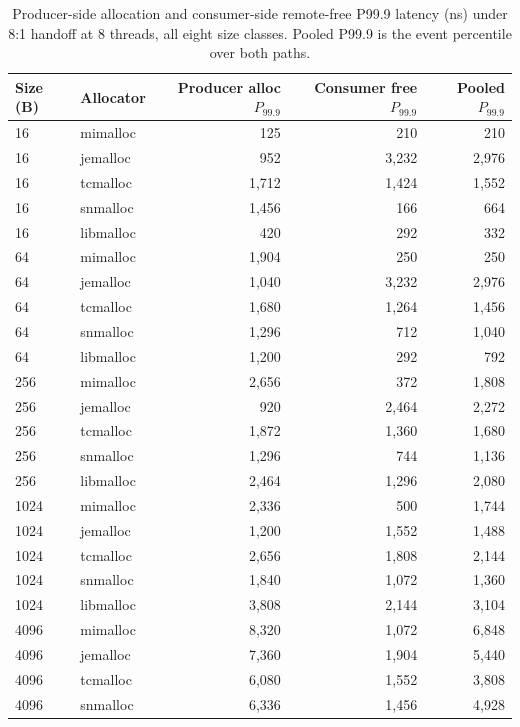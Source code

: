 \begin{table}[!htbp]
\centering
\footnotesize
\setlength{\tabcolsep}{3pt}
\caption{Producer-side allocation and consumer-side remote-free P99.9 latency (ns) under 8:1 handoff at 8 threads, all eight size classes. Pooled P99.9 is the event percentile over both paths.}
\label{tab:producer-consumer-8to1}
\begin{tabular}{llrrr}
\toprule
Size (B) & Allocator & Producer alloc $P_{99.9}$ & Consumer free $P_{99.9}$ & Pooled $P_{99.9}$\\
\midrule
16 & mimalloc & 125 & 210 & 210 \\
16 & jemalloc & 952 & 3{,}232 & 2{,}976 \\
16 & tcmalloc & 1{,}712 & 1{,}424 & 1{,}552 \\
16 & snmalloc & 1{,}456 & 166 & 664 \\
16 & libmalloc & 420 & 292 & 332 \\
64 & mimalloc & 1{,}904 & 250 & 250 \\
64 & jemalloc & 1{,}040 & 3{,}232 & 2{,}976 \\
64 & tcmalloc & 1{,}680 & 1{,}264 & 1{,}456 \\
64 & snmalloc & 1{,}296 & 712 & 1{,}040 \\
64 & libmalloc & 1{,}200 & 292 & 792 \\
256 & mimalloc & 2{,}656 & 372 & 1{,}808 \\
256 & jemalloc & 920 & 2{,}464 & 2{,}272 \\
256 & tcmalloc & 1{,}872 & 1{,}360 & 1{,}680 \\
256 & snmalloc & 1{,}296 & 744 & 1{,}136 \\
256 & libmalloc & 2{,}464 & 1{,}296 & 2{,}080 \\
1024 & mimalloc & 2{,}336 & 500 & 1{,}744 \\
1024 & jemalloc & 1{,}200 & 1{,}552 & 1{,}488 \\
1024 & tcmalloc & 2{,}656 & 1{,}808 & 2{,}144 \\
1024 & snmalloc & 1{,}840 & 1{,}072 & 1{,}360 \\
1024 & libmalloc & 3{,}808 & 2{,}144 & 3{,}104 \\
4096 & mimalloc & 8{,}320 & 1{,}072 & 6{,}848 \\
4096 & jemalloc & 7{,}360 & 1{,}904 & 5{,}440 \\
4096 & tcmalloc & 6{,}080 & 1{,}552 & 3{,}808 \\
4096 & snmalloc & 6{,}336 & 1{,}456 & 4{,}928 \\

\end{tabular}
\end{table}
